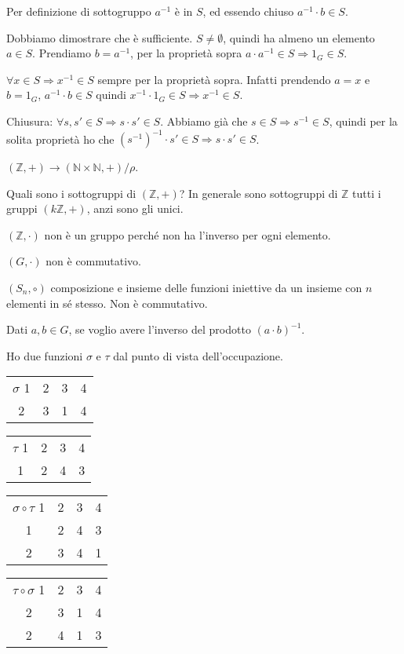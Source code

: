 Per definizione di sottogruppo $a^{-1}$ \`e in $S$, ed essendo chiuso $a^{-1} \cdot b \in S$.

Dobbiamo dimostrare che \`e sufficiente. $S \neq \emptyset$, quindi ha almeno un elemento $a \in S$. Prendiamo $b = a^{-1} $, per la propriet\`a sopra $a \cdot a^{-1} \in S \Rightarrow 1_G \in S$.

$\forall x \in S \Rightarrow x^{-1} \in S$ sempre per la propriet\`a sopra. Infatti prendendo $a = x$ e $b = 1_G$, $a^{-1} \cdot b \in S$ quindi $x^{-1} \cdot 1_G \in S \Rightarrow x^{-1} \in S$.

Chiusura: $\forall s, s' \in S \Rightarrow s \cdot s' \in S$. Abbiamo gi\`a che $s \in S \Rightarrow s^{-1} \in S$, quindi per la solita propriet\`a ho che $(s^{-1})^{-1} \cdot s' \in S \Rightarrow s \cdot s' \in S$.

$(\mathbb{Z}, +) \to (\mathbb{N} \times \mathbb{N}, +) / \rho$.

Quali sono i sottogruppi di $(\mathbb{Z}, +)$? In generale sono sottogruppi di $\mathbb{Z}$ tutti i gruppi $(k \mathbb{Z}, +)$, anzi sono gli unici.

$(\mathbb{Z}, \cdot)$ non \`e un gruppo perch\'e non ha l'inverso per ogni elemento.

$(G, \cdot)$ non \`e commutativo.

$(S_n, \circ)$ composizione e insieme delle funzioni iniettive da un insieme con $n$ elementi in s\'e stesso. Non \`e commutativo.

Dati $a, b \in G$, se voglio avere l'inverso del prodotto $(a \cdot b)^{-1}$.

Ho due funzioni $\sigma$ e $\tau$ dal punto di vista dell'occupazione.

\begin{tabular}{cccc}
$\sigma$
1 & 2 & 3 & 4 \\
2 & 3 & 1 & 4
\end{tabular}

\begin{tabular}{cccc}
$\tau$
1 & 2 & 3 & 4 \\
1 & 2 & 4 & 3
\end{tabular}

\begin{tabular}{cccc}
$\sigma \circ \tau$
1 & 2 & 3 & 4 \\
1 & 2 & 4 & 3 \\
2 & 3 & 4 & 1
\end{tabular}

\begin{tabular}{cccc}
$\tau \circ \sigma$
1 & 2 & 3 & 4 \\
2 & 3 & 1 & 4 \\
2 & 4 & 1 & 3
\end{tabular}

